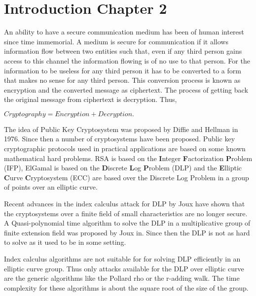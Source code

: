 
\section[SEC-1]{Introduction Chapter 2}

An ability to have a secure communication medium has been of human interest since time immemorial.
A medium is secure for communication if it allows information flow between two entities such that, even if any third person 
gains access to this channel the information flowing is of no use to that person.
For the information to be useless for any third person it has to be converted to a form that makes no sense for any third person.
This conversion process is known as encryption and the converted message as ciphertext. 
The process of getting back the original message from ciphertext is decryption.
Thus,

\begin{center}
$\displaystyle
        Cryptography  = Encryption + Decryption. 
$
\end{center}

The idea of Public Key Cryptosystem was proposed by Diffie and Hellman in 1976. Since then a number of cryptosystems have been proposed.
Public key cryptographic protocols used in practical applications are based on some known mathematical hard problems.
RSA is based on the \textbf{I}nteger \textbf{F}actorization \textbf{P}roblem (IFP), ElGamal is based on the \textbf{D}iscrete \textbf{L}og 
\textbf{P}roblem (DLP) and the 
\textbf{E}lliptic \textbf{C}urve \textbf{C}ryptosystem (ECC) are based over the Discrete Log Problem in a group of points over an elliptic curve.

Recent advances in the index calculus attack for DLP by Joux have shown that the cryptosystems over a finite field of small characteristics are no longer
secure.
A Quasi-polynomial time algorithm to solve the DLP in a multiplicative group of finite extension field was proposed by Joux in. Since then the DLP
is not as hard to solve as it used to be in some setting.

Index calculus algorithms are not suitable for for solving DLP efficiently in an elliptic curve group.
Thus only attacks available for the DLP over elliptic curve are the generic algorithms like the Pollard rho or the r-adding walk.
The time complexity for these algorithms is about the square root of the size of the group.

